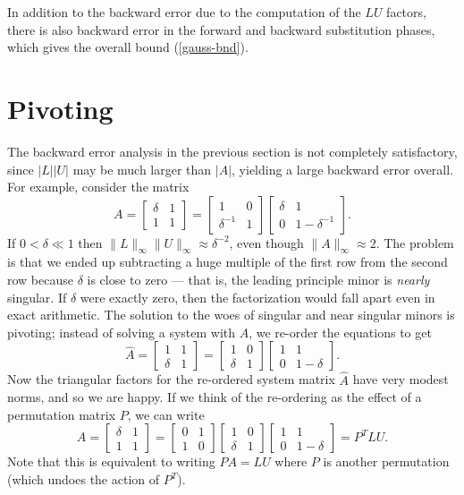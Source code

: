 \documentclass[12pt, leqno]{article} %
\begin{document}
In addition to the backward error due to the computation of the $LU$
factors, there is also backward error in the forward and backward
substitution phases, which gives the overall bound (\ref{gauss-bnd}).
\section{Pivoting}

The backward error analysis in the previous section is not completely
satisfactory, since $|L| |U|$ may be much larger than $|A|$, yielding
a large backward error overall.  For example, consider the matrix
\[
  A = \begin{bmatrix} \delta & 1 \\ 1 & 1 \end{bmatrix} =
      \begin{bmatrix} 1 & 0 \\ \delta^{-1} & 1 \end{bmatrix}
      \begin{bmatrix} \delta & 1 \\ 0 & 1-\delta^{-1} \end{bmatrix}.
\]
If $0 < \delta \ll 1$ then $\|L\|_{\infty} \|U\|_{\infty} \approx
\delta^{-2}$, even though $\|A\|_{\infty} \approx 2$.  The problem is
that we ended up subtracting a huge multiple of the first row from the
second row because $\delta$ is close to zero --- that is, the leading
principle minor is {\em nearly} singular.  If $\delta$ were exactly
zero, then the factorization would fall apart even in exact
arithmetic.  The solution to the woes of singular and near singular minors
is pivoting; instead of solving a system with $A$, we re-order the
equations to get
\[
  \hat{A} =
      \begin{bmatrix} 1 & 1 \\ \delta & 1 \end{bmatrix} =
      \begin{bmatrix} 1 & 0 \\ \delta & 1 \end{bmatrix}
      \begin{bmatrix} 1 & 1 \\ 0 & 1-\delta \end{bmatrix}.
\]
Now the triangular factors for the re-ordered system matrix $\hat{A}$
have very modest norms, and so we are happy.  If we think of the re-ordering
as the effect of a permutation matrix $P$, we can write
\[
  A = \begin{bmatrix} \delta & 1 \\ 1 & 1 \end{bmatrix} =
      \begin{bmatrix} 0 & 1 \\ 1 & 0 \end{bmatrix}
      \begin{bmatrix} 1 & 0 \\ \delta & 1 \end{bmatrix}
      \begin{bmatrix} 1 & 1 \\ 0 & 1-\delta \end{bmatrix}
    = P^T LU.
\]
Note that this is equivalent to writing $P A = LU$ where $P$
is another permutation (which undoes the action of $P^T$).
\end{document}
